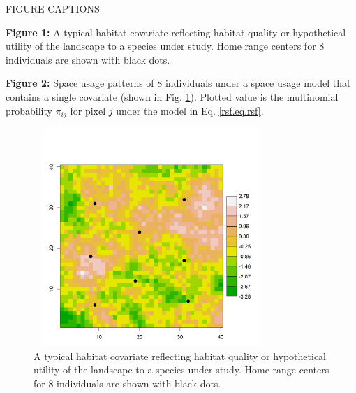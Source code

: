 \documentclass[12pt]{article}
\begin{document}
\clearpage

\newpage


{\flushleft FIGURE CAPTIONS }

\vspace{.2in}


{\flushleft \bf
Figure 1:}
A typical habitat covariate reflecting habitat quality or
  hypothetical utility of the landscape to a species under study. Home range centers for 8 individuals are
shown with black dots.

\vspace{.2in}

{\flushleft \bf Figure 2:}
Space usage patterns of 8 individuals under a space usage
  model that contains a single covariate (shown in
  Fig. \ref{rsf.fig.habitat}). Plotted value is the multinomial
  probability $\pi_{ij}$ for pixel $j$ under the model in Eq. \ref{rsf.eq.rsf}.


\newpage


\begin{figure}
\centering
\includegraphics[width=3.5in,height=3.25in]{figs/habitat.png}
\caption{A typical habitat covariate reflecting habitat quality or
  hypothetical utility of the landscape to a species under study. Home range centers for 8 individuals are
shown with black dots.}
\label{rsf.fig.habitat}
\end{figure}
\end{document}
